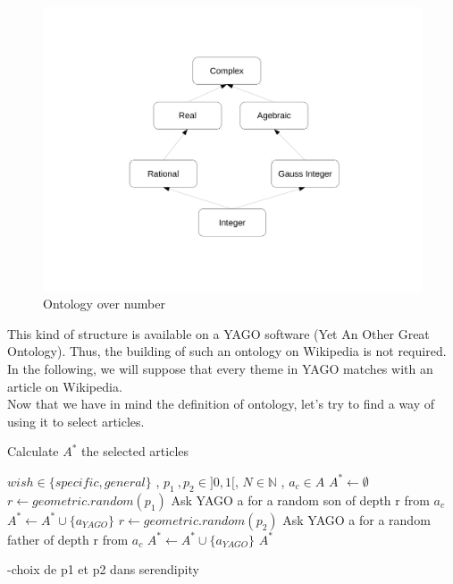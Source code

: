 \documentclass[11pt]{article}
\theoremstyle{plain}
\theoremstyle{definition}
\theoremstyle{remark}
\begin{document}
\begin{figure}[!h]
	\centering
    \includegraphics[scale = 0.3]{ExOntology.pdf}
    \caption{Ontology over number}
\end{figure}

This kind of structure is available on a YAGO software (Yet An Other Great Ontology). Thus, the building of such an ontology on Wikipedia is not required. In the following, we will suppose that every theme in YAGO matches with an article on Wikipedia. \\
Now that we have in mind the definition of ontology, let's try to find a way of using it to select articles.\\


\begin{algorithm}
  \caption{Calculate $A^*$ the selected articles}
  \begin{algorithmic}
    \REQUIRE $wish \in \{specific , general\}$ , $p_1 \: ,p_2 \in ]0,1[ $, $N \in \mathbb{N}$ , $a_c \in A$
    \STATE $A^* \leftarrow \emptyset$
    \STATE $ r \leftarrow geometric.random(p_1)$
    \STATE Ask YAGO a for a random son of depth r from $a_c$
    \STATE $ A^* \leftarrow A^* \cup \{a_{YAGO}\}$
    \ELSE
    \STATE $ r \leftarrow geometric.random(p_2)$
    \STATE Ask YAGO a for a random father of depth r from $a_c$
    \STATE $ A^*  \leftarrow A^* \cup \{a_{YAGO}\}$ 
    \ENDIF
    \ENDWHILE
    \RETURN $A^*$
  \end{algorithmic}
\end{algorithm}

-choix de p1 et p2 dans serendipity
\end{document}
